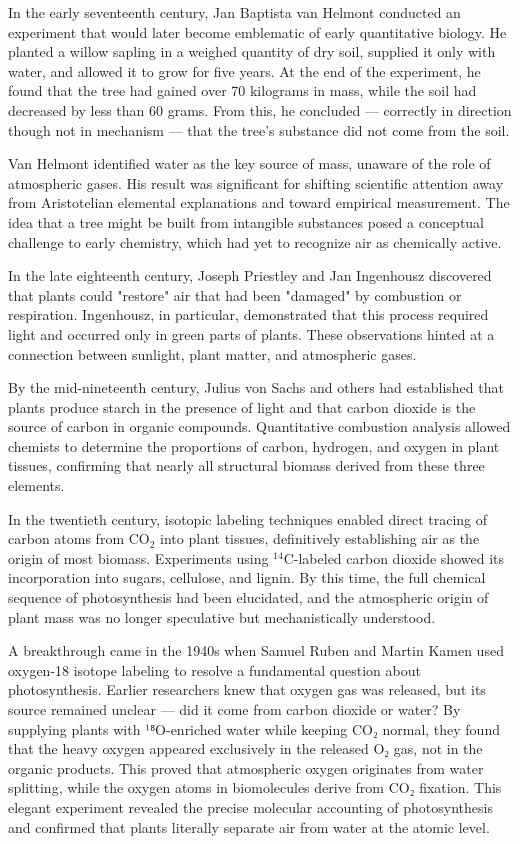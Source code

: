 \begin{historical}
In the early seventeenth century, Jan Baptista van Helmont conducted an experiment that would later become emblematic of early quantitative biology. He planted a willow sapling in a weighed quantity of dry soil, supplied it only with water, and allowed it to grow for five years. At the end of the experiment, he found that the tree had gained over 70 kilograms in mass, while the soil had decreased by less than 60 grams. From this, he concluded — correctly in direction though not in mechanism — that the tree's substance did not come from the soil.

Van Helmont identified water as the key source of mass, unaware of the role of atmospheric gases. His result was significant for shifting scientific attention away from Aristotelian elemental explanations and toward empirical measurement. The idea that a tree might be built from intangible substances posed a conceptual challenge to early chemistry, which had yet to recognize air as chemically active.

In the late eighteenth century, Joseph Priestley and Jan Ingenhousz discovered that plants could "restore" air that had been "damaged" by combustion or respiration. Ingenhousz, in particular, demonstrated that this process required light and occurred only in green parts of plants. These observations hinted at a connection between sunlight, plant matter, and atmospheric gases.

By the mid-nineteenth century, Julius von Sachs and others had established that plants produce starch in the presence of light and that carbon dioxide is the source of carbon in organic compounds. Quantitative combustion analysis allowed chemists to determine the proportions of carbon, hydrogen, and oxygen in plant tissues, confirming that nearly all structural biomass derived from these three elements.

In the twentieth century, isotopic labeling techniques enabled direct tracing of carbon atoms from \(\mathrm{CO}_2\) into plant tissues, definitively establishing air as the origin of most biomass. Experiments using \(^{14}\mathrm{C}\)-labeled carbon dioxide showed its incorporation into sugars, cellulose, and lignin. By this time, the full chemical sequence of photosynthesis had been elucidated, and the atmospheric origin of plant mass was no longer speculative but mechanistically understood.

A breakthrough came in the 1940s when Samuel Ruben and Martin Kamen used oxygen-18 isotope labeling to resolve a fundamental question about photosynthesis. Earlier researchers knew that oxygen gas was released, but its source remained unclear — did it come from carbon dioxide or water? By supplying plants with ¹⁸O-enriched water while keeping CO₂ normal, they found that the heavy oxygen appeared exclusively in the released O₂ gas, not in the organic products. This proved that atmospheric oxygen originates from water splitting, while the oxygen atoms in biomolecules derive from CO₂ fixation. This elegant experiment revealed the precise molecular accounting of photosynthesis and confirmed that plants literally separate air from water at the atomic level.


\end{historical}
